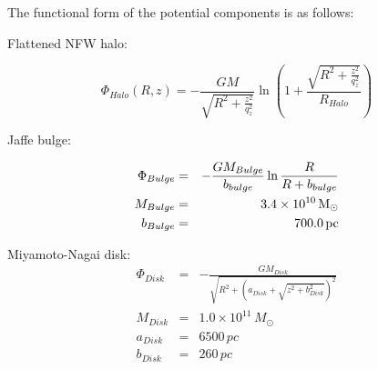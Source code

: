 The functional form of the potential components is as follows:

Flattened NFW halo:

\begin{equation}
  \Phi_{Halo}(R, z) = -\frac{GM}{\sqrt{R^2+\frac{z^2}{q_z^2}}}\ln\left(1+\frac{\sqrt{R^2+\frac{z^2}{q_z^2}}}{R_{Halo}} \right)
\end{equation}

Jaffe bulge:

\begin{eqnarray}
  \Phi_{Bulge} &=& -\frac{GM_{Bulge}}{b_{bulge}}\ln{\frac{R}{R+b_{bulge}}}\\
  M_{Bulge} &=& 3.4\times 10^{10}\mbox{$\,{\rm M}_\odot$}\\
  b_{Bulge} &=& 700.0\,\mbox{pc}
\end{eqnarray}

Miyamoto-Nagai disk:
\begin{eqnarray}
  \Phi_{Disk} &=& -\frac{GM_{Disk}}{\sqrt{R^2+\left(a_{Disk}+\sqrt{z^2+b_{Disk}^2}\right)^2}}\\
  M_{Disk} &=& 1.0\times 10^{11}\,M_{\odot}\\
  a_{Disk} &=& 6500\,pc\\
  b_{Disk} &=& 260\,pc
\end{eqnarray}



